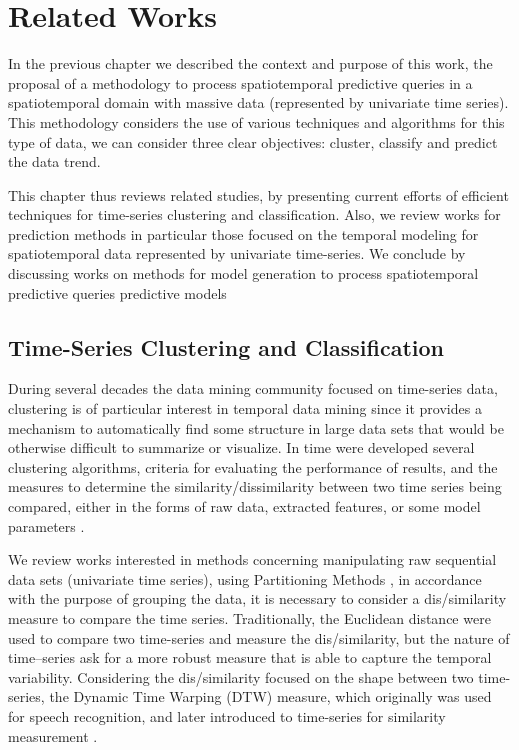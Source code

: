 \chapter{Related Works}
\label{chapter_Related_Works}

In the previous chapter we described the context and purpose of this work, the proposal of a methodology to process spatiotemporal predictive queries in a spatiotemporal domain with massive data (represented by univariate time series). This methodology considers the use of various techniques and algorithms for this type of data, we can consider three clear objectives: cluster, classify and predict the data trend. 

This chapter thus reviews related studies, by presenting current efforts of efficient techniques for time-series clustering and classification. Also, we review works for prediction methods in particular those focused on the temporal modeling for spatiotemporal data represented by univariate time-series. We conclude by discussing works on methods for model generation to process spatiotemporal predictive queries predictive models

\section{Time-Series Clustering and Classification}
\label{Sec:ClusteringRelatedWorks}

During several decades the data mining community focused on time-series data, clustering is of particular interest in temporal data mining since it provides a mechanism to automatically find some structure in large data sets that would be otherwise difficult to summarize or visualize. In time were developed several clustering algorithms, criteria for evaluating the performance of results, and the measures to determine the similarity/dissimilarity between two time series being compared, either in the forms of raw data, extracted features, or some model parameters \cite{Liao2005, Aghabozorgi2015}.

We review works interested in methods concerning manipulating raw sequential data sets (univariate time series), using Partitioning Methods \cite{Kaufman2009}, in accordance with the purpose of grouping the data, it is necessary to consider a dis/similarity measure to compare the time series. Traditionally, the Euclidean distance were used to compare two time-series and measure the dis/similarity, but the nature of time--series ask for a more robust measure that is able to capture the temporal variability. Considering the dis/similarity focused on the shape between two time-series, the Dynamic Time Warping (DTW) measure, which originally was used for speech recognition, and later introduced to time-series for similarity measurement \cite{Sakoe1978}.


